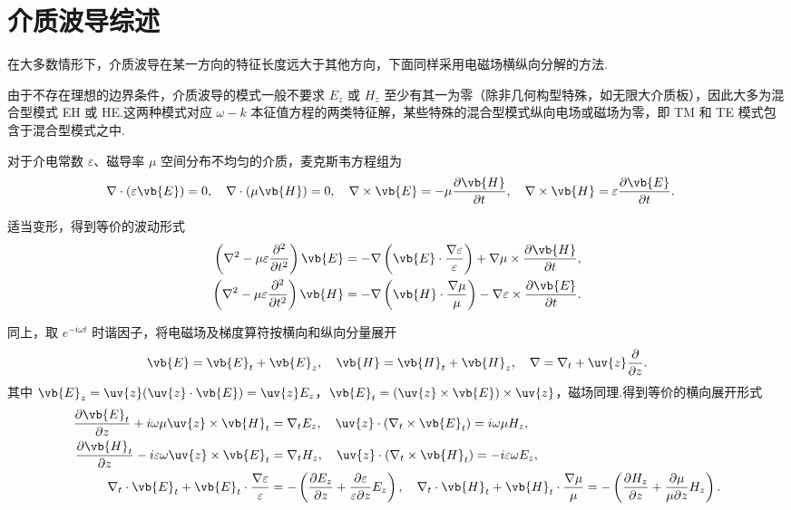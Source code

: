 \section{介质波导综述}

在大多数情形下，介质波导在某一方向的特征长度远大于其他方向，下面同样采用电磁场横纵向分解的方法.

由于不存在理想的边界条件，介质波导的模式一般不要求 \(E_z\) 或 \(H_z\) 至少有其一为零（除非几何构型特殊，如无限大介质板），因此大多为混合型模式 EH 或 HE.这两种模式对应 \(\omega - k\) 本征值方程的两类特征解，某些特殊的混合型模式纵向电场或磁场为零，即 TM 和 TE 模式包含于混合型模式之中.

对于介电常数 \(\varepsilon\)、磁导率 \(\mu\) 空间分布不均匀的介质，麦克斯韦方程组为
\begin{align*}
	\nabla \cdot (\varepsilon \vb{E}) &= 0, \quad \nabla \cdot (\mu \vb{H}) = 0, \quad
	\nabla \times \vb{E} = -\mu \dfrac{\partial \vb{H}}{\partial t}, \quad \nabla \times \vb{H} = \varepsilon \dfrac{\partial \vb{E}}{\partial t}.
\end{align*}

适当变形，得到等价的波动形式
\begin{align*}
	\left( \nabla^2 - \mu\varepsilon \dfrac{\partial^2}{\partial t^2} \right) \vb{E} &= -\nabla \left( \vb{E} \cdot \dfrac{\nabla \varepsilon}{\varepsilon} \right) + \nabla \mu \times \dfrac{\partial \vb{H}}{\partial t}, \\
	\left( \nabla^2 - \mu\varepsilon \dfrac{\partial^2}{\partial t^2} \right) \vb{H} &= -\nabla \left( \vb{H} \cdot \dfrac{\nabla \mu}{\mu} \right) - \nabla \varepsilon \times \dfrac{\partial \vb{E}}{\partial t}.
\end{align*}

同上，取 \(e^{-i\omega t}\) 时谐因子，将电磁场及梯度算符按横向和纵向分量展开
\begin{align*}
	\vb{E} = \vb{E}_t + \vb{E}_z, \quad \vb{H} = \vb{H}_t + \vb{H}_z, \quad \nabla = \nabla_t + \uv{z} \dfrac{\partial}{\partial z}.
\end{align*}
其中 \(\vb{E}_z = \uv{z} (\uv{z} \cdot \vb{E}) = \uv{z} E_z\)，\(\vb{E}_t = (\uv{z} \times \vb{E}) \times \uv{z}\)，磁场同理.得到等价的横向展开形式
\begin{align*}
	\dfrac{\partial \vb{E}_t}{\partial z} + i\omega\mu \uv{z} \times \vb{H}_t &= \nabla_t E_z, \quad
	\uv{z} \cdot (\nabla_t \times \vb{E}_t) = i\omega\mu H_z, \\
	\dfrac{\partial \vb{H}_t}{\partial z} - i\varepsilon\omega \uv{z} \times \vb{E}_t &= \nabla_t H_z, \quad
	\uv{z} \cdot (\nabla_t \times \vb{H}_t) = -i\varepsilon\omega E_z, \\
	\nabla_t \cdot \vb{E}_t + \vb{E}_t \cdot \dfrac{\nabla \varepsilon}{\varepsilon} &= -\left( \dfrac{\partial E_z}{\partial z} + \dfrac{\partial \varepsilon}{\varepsilon \partial z} E_z \right), \quad
	\nabla_t \cdot \vb{H}_t + \vb{H}_t \cdot \dfrac{\nabla \mu}{\mu} = -\left( \dfrac{\partial H_z}{\partial z} + \dfrac{\partial \mu}{\mu \partial z} H_z \right).
\end{align*}

